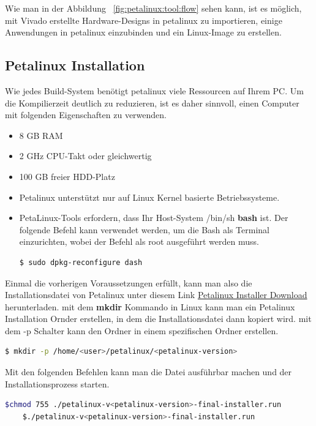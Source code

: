 Wie man in der Abbildung ~\ref{fig:petalinux:tool:flow} sehen kann, ist es möglich, mit Vivado erstellte Hardware-Designs in petalinux zu importieren, einige Anwendungen in petalinux einzubinden und ein Linux-Image zu erstellen.  

\subsection{Petalinux Installation}
Wie jedes Build-System benötigt petalinux viele Ressourcen auf Ihrem PC. Um die Kompilierzeit deutlich zu reduzieren, ist es daher sinnvoll, einen Computer mit folgenden Eigenschaften zu verwenden.\cite{Xilinx2020}

\begin{itemize}
	\item 8 GB RAM
	\item 2 GHz CPU-Takt oder gleichwertig
	\item 100 GB freier HDD-Platz
	\item Petalinux unterstützt nur auf Linux Kernel basierte Betriebssysteme. 
	\item PetaLinux-Tools erfordern, dass Ihr Host-System /bin/sh \textbf{bash} ist. Der folgende Befehl kann verwendet werden, um die Bash als Terminal einzurichten, wobei der Befehl als root ausgeführt werden muss. 
	\begin{lstlisting}[language=bash]
		$ sudo dpkg-reconfigure dash
	\end{lstlisting}
\end{itemize}

 Einmal die vorherigen Voraussetzungen erfüllt, kann man also die Installationsdatei von Petalinux unter diesem Link \href{https://www.xilinx.com/support/download/index.html/content/xilinx/en/downloadNav/embedded-design-tools.html}{Petalinux Installer Download}  herunterladen. 
 mit dem \textbf{mkdir} Kommando in Linux kann man ein Petalinux Installation Ornder erstellen, in dem die Installationsdatei dann kopiert wird. mit dem -p Schalter kann den Ordner in einem spezifischen Ordner erstellen.\\
 
\begin{lstlisting}[language=bash]
 	$ mkdir -p /home/<user>/petalinux/<petalinux-version>
\end{lstlisting}

Mit den folgenden Befehlen kann man die Datei ausführbar machen und der Installationsprozess starten.
\begin{lstlisting}[language=bash]
 	$chmod 755 ./petalinux-v<petalinux-version>-final-installer.run
	$./petalinux-v<petalinux-version>-final-installer.run
\end{lstlisting}

